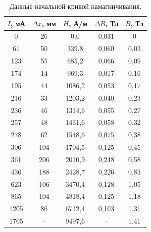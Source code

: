 \documentclass[a4paper,12pt]{article} %
\begin{document}
	\begin{table}[H]
		\caption{Данные начальной кривой намагничивания.}
		\label{table:start}
		\begin{tabular}{|c|c|c|c|c|}
			\hline
			$I$, мА & $\Delta x$, мм & $H$, А/м & $\Delta B$, Тл & $B$, Тл \\ \hline
			0       & 26             & 0,0      & 0,031          & 0       \\ \hline
			61      & 50             & 339,8    & 0,060          & 0,03    \\ \hline
			123     & 55             & 685,2    & 0,066          & 0,09    \\ \hline
			174     & 14             & 969,3    & 0,017          & 0,16    \\ \hline
			195     & 44             & 1086,2   & 0,053          & 0,17    \\ \hline
			216     & 33             & 1203,2   & 0,040          & 0,23    \\ \hline
			236     & 46             & 1314,6   & 0,055          & 0,27    \\ \hline
			257     & 48             & 1431,6   & 0,058          & 0,32    \\ \hline
			278     & 62             & 1548,6   & 0,075          & 0,38    \\ \hline
			306     & 104            & 1704,5   & 0,125          & 0,45    \\ \hline
			361     & 206            & 2010,9   & 0,248          & 0,58    \\ \hline
			436     & 188            & 2428,7   & 0,226          & 0,83    \\ \hline
			623     & 106            & 3470,4   & 0,128          & 1,05    \\ \hline
			865     & 104            & 4818,4   & 0,125          & 1,18    \\ \hline
			1205    & 86             & 6712,4   & 0,103          & 1,31    \\ \hline
			1705    &  -              & 9497,6   &    -            & 1,41    \\ \hline
		\end{tabular}
	\end{table}

		
\newpage
\end{document}
